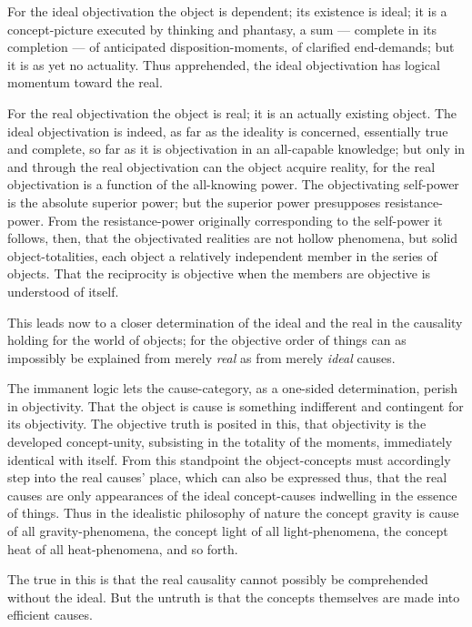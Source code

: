 \documentclass[12pt]{book}
\begin{document}
For the ideal objectivation the object is dependent; its existence
is ideal; it is a concept-picture executed by thinking and phantasy,
a sum --- complete in its completion --- of anticipated
disposition-moments, of clarified end-demands; but it is as yet no
actuality. Thus apprehended, the ideal objectivation has logical
momentum toward the real.

For the real objectivation the object is real; it is an actually
existing object. The ideal objectivation is indeed, as far as the
ideality is concerned, essentially true and complete, so far as it
is objectivation in an all-capable knowledge; but only in and
through the real objectivation can the object acquire reality, for
the real objectivation is a function of the all-knowing power. The
objectivating self-power is the absolute superior power; but the
superior power presupposes resistance-power. From the
resistance-power originally corresponding to the self-power it
follows, then, that the objectivated realities are not hollow
phenomena, but solid object-totalities, each object a relatively
independent member in the series of objects. That the reciprocity is
objective when the members are objective is understood of itself.

This leads now to a closer determination of the ideal and the real
in the causality holding for the world of objects; for the objective
order of things can as impossibly be explained from merely
\emph{real} as from merely \emph{ideal} causes.

The immanent logic lets the cause-category, as a one-sided
determination, perish in objectivity. That the object is cause is
something indifferent and contingent for its objectivity. The
objective truth is posited in this, that objectivity is the
developed concept-unity, subsisting in the totality of the moments,
immediately identical with itself. From this standpoint the
object-concepts must accordingly step into the real
causes' place, which can also be expressed thus, that the real
causes are only appearances of the ideal concept-causes indwelling
in the essence of things. Thus in the idealistic philosophy of
nature the concept gravity is cause of all gravity-phenomena, the
concept light of all light-phenomena, the concept heat of all
heat-phenomena, and so forth.

The true in this is that the real causality cannot possibly be
comprehended without the ideal. But the untruth is that the concepts
themselves are made into efficient causes.
\end{document}

